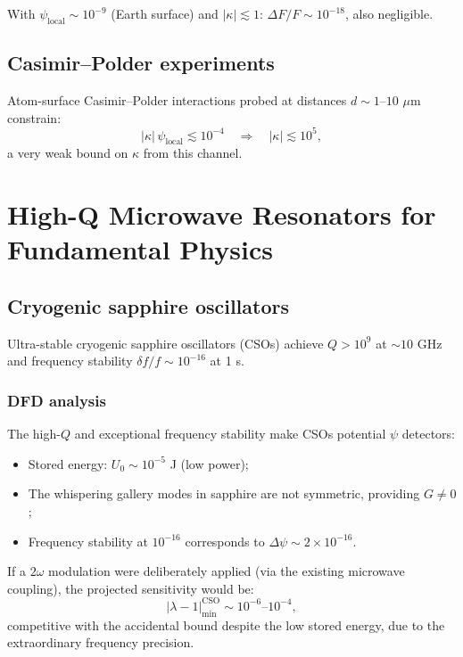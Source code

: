 \documentclass[12pt,letterpaper]{article}
\begin{document}
With $\psi_{\text{local}} \sim 10^{-9}$ (Earth surface) and
$|\kappa| \lesssim 1$: $\Delta F/F \sim 10^{-18}$, also negligible.

\subsection{Casimir--Polder experiments}

Atom-surface Casimir--Polder interactions probed at distances
$d \sim 1$--$10$ $\mu$m constrain:
\begin{equation}
  |\kappa|\,\psi_{\text{local}} \lesssim 10^{-4}
  \quad\Rightarrow\quad |\kappa| \lesssim 10^5,
\end{equation}
a very weak bound on $\kappa$ from this channel.

\section{High-Q Microwave Resonators for Fundamental Physics}

\subsection{Cryogenic sapphire oscillators}

Ultra-stable cryogenic sapphire oscillators (CSOs) achieve
$Q > 10^9$ at $\sim 10$ GHz and frequency stability
$\delta f/f \sim 10^{-16}$ at 1 s.

\subsubsection{DFD analysis}

The high-$Q$ and exceptional frequency stability make CSOs potential
$\psi$ detectors:
\begin{itemize}[noitemsep]
  \item Stored energy: $U_0 \sim 10^{-5}$ J (low power);
  \item The whispering gallery modes in sapphire are not symmetric,
    providing $G \neq 0$;
  \item Frequency stability at $10^{-16}$ corresponds to
    $\Delta\psi \sim 2\times 10^{-16}$.
\end{itemize}

If a $2\omega$ modulation were deliberately applied (via the existing
microwave coupling), the projected sensitivity would be:
\begin{equation}
  |\lambda - 1|_{\min}^{\text{CSO}}
  \sim 10^{-6}\text{--}10^{-4},
\end{equation}
competitive with the accidental bound despite the low stored energy,
due to the extraordinary frequency precision.
\end{document}
